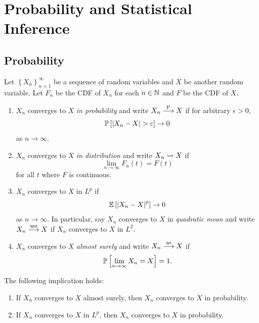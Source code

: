 \documentclass[a4paper]{article}
\begin{document}
\maketitle

\tableofcontents

\section{Probability and Statistical Inference}

\subsection{Probability}
\begin{defi}
Let $\left\{ X_n \right\}_{n=1}^\infty$ be a sequence of random
variables and $X$ be another random variable. Let 
$F_n$ be the CDF of $X_n$ for each $n \in \mathbb{N}$ and $F$ 
be the CDF of $X$. 
\begin{enumerate}
  \item $X_n$ converges to $X$ \emph{in probability} 
  and write $X_n \overset{\mathrm{P}}{\longrightarrow} X$ if for arbitrary 
  $\epsilon > 0$, 
  \[
  \mathbb{P} \left[ \left\lvert X_n - X\right\rvert > \varepsilon \right] \to 0
  \]
  as $n \to \infty$.

  \item $X_n$ converges to $X$ \emph{in distribution} and 
  write $X_n \rightsquigarrow X$ if 
  \[
  \lim_{n \to \infty} F_n(t) = F(t)
  \]
  for all $t$ where $F$ is continuous.
  
  \item $X_n$ converges to $X$ in $L^p$ if 
  \[
  \mathbb{E} \left[ \left\lvert X_n - X\right\rvert^p \right] \to 0
  \]
  as $n \to \infty$. In particular, say $X_n$ converges to 
  $X$ in \emph{quadratic mean} and write $X_n \overset{\mathrm{qm}}{\longrightarrow} X$
  if $X_n$ converges to $X$ in $L^2$.

  \item $X_n$ converges to $X$ \emph{almost surely} 
  and write $X_n \overset{\mathrm{as}}{\longrightarrow} X$ if 
  \[
  \mathbb{P} \left[ \lim_{n \to \infty} X_n =  X \right] = 1. 
  \]
\end{enumerate}
\end{defi}

\begin{thm}
The following implication holds:
\begin{enumerate}
  \item If $X_n$ converges to $X$ almost surely, 
  then $X_n$ converges to $X$ in probability. 
  
  \item If $X_n$ converges to $X$ in $L^p$, then 
  $X_n$ converges to $X$ in probability.
\end{enumerate}
\end{thm}
\end{document}
